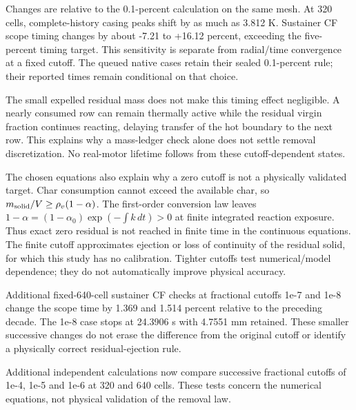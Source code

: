 \documentclass[oneside,openany]{amsdtx}
\begin{document}
Changes are relative to the 0.1-percent calculation on the same mesh. At 320 cells, complete-history casing peaks shift by as much as 3.812 K. Sustainer CF scope timing changes by about -7.21 to +16.12 percent, exceeding the five-percent timing target. This sensitivity is separate from radial/time convergence at a fixed cutoff. The queued native cases retain their sealed 0.1-percent rule; their reported times remain conditional on that choice.

The small expelled residual mass does not make this timing effect negligible. A nearly consumed row can remain thermally active while the residual virgin fraction continues reacting, delaying transfer of the hot boundary to the next row. This explains why a mass-ledger check alone does not settle removal discretization. No real-motor lifetime follows from these cutoff-dependent states.

The chosen equations also explain why a zero cutoff is not a physically validated target. Char consumption cannot exceed the available char, so $m_{\rm solid}/V \geq \rho_v(1-\alpha)$. The first-order conversion law leaves $1-\alpha=(1-\alpha_0)\exp(-\int k\,dt)>0$ at finite integrated reaction exposure. Thus exact zero residual is not reached in finite time in the continuous equations. The finite cutoff approximates ejection or loss of continuity of the residual solid, for which this study has no calibration. Tighter cutoffs test numerical/model dependence; they do not automatically improve physical accuracy.

Additional fixed-640-cell sustainer CF checks at fractional cutoffs 1e-7 and 1e-8 change the scope time by 1.369 and 1.514 percent relative to the preceding decade. The 1e-8 case stops at 24.3906 s with 4.7551 mm retained. These smaller successive changes do not erase the difference from the original cutoff or identify a physically correct residual-ejection rule.

Additional independent calculations now compare successive fractional cutoffs of 1e-4, 1e-5 and 1e-6 at 320 and 640 cells. These tests concern the numerical equations, not physical validation of the removal law.
\end{document}
